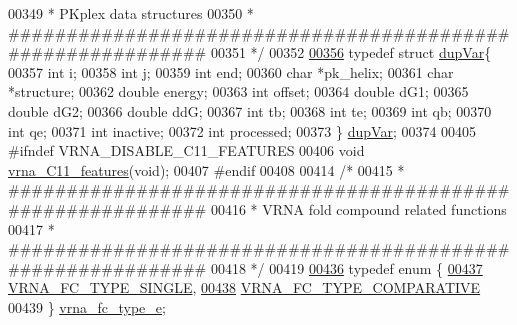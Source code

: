 \begin{DoxyCode}
00349 \textcolor{comment}{* PKplex data structures}
00350 \textcolor{comment}{* ############################################################}
00351 \textcolor{comment}{*/}
00352 
\hypertarget{data__structures_8h_source.tex_l00356}{}\hyperlink{group__data__structures}{00356} \textcolor{keyword}{typedef} \textcolor{keyword}{struct }\hyperlink{group__data__structures_structdupVar}{dupVar}\{
00357   \textcolor{keywordtype}{int} i;
00358   \textcolor{keywordtype}{int} j;
00359   \textcolor{keywordtype}{int} end;
00360   \textcolor{keywordtype}{char} *pk\_helix;
00361   \textcolor{keywordtype}{char} *structure;
00362   \textcolor{keywordtype}{double} energy;
00363   \textcolor{keywordtype}{int} offset;
00364   \textcolor{keywordtype}{double} dG1;
00365   \textcolor{keywordtype}{double} dG2;
00366   \textcolor{keywordtype}{double} ddG;
00367   \textcolor{keywordtype}{int} tb;
00368   \textcolor{keywordtype}{int} te;
00369   \textcolor{keywordtype}{int} qb;
00370   \textcolor{keywordtype}{int} qe;
00371   \textcolor{keywordtype}{int} inactive;
00372   \textcolor{keywordtype}{int} processed;
00373 \} \hyperlink{group__data__structures_gabd3b93f9aaa9f3acce2d148bae97d24e}{dupVar};
00374 
00405 \textcolor{preprocessor}{#ifndef VRNA\_DISABLE\_C11\_FEATURES}
00406 \textcolor{keywordtype}{void} \hyperlink{group__data__structures_ga21744ae2d6a17309f9327d3547cef0cb}{vrna\_C11\_features}(\textcolor{keywordtype}{void});
00407 \textcolor{preprocessor}{#endif}
00408 
00414 \textcolor{comment}{/*}
00415 \textcolor{comment}{* ############################################################}
00416 \textcolor{comment}{* VRNA fold compound related functions}
00417 \textcolor{comment}{* ############################################################}
00418 \textcolor{comment}{*/}
00419 
\hypertarget{data__structures_8h_source.tex_l00436}{}\hyperlink{group__fold__compound_ga01a4ff86fa71deaaa5d1abbd95a1447d}{00436} \textcolor{keyword}{typedef} \textcolor{keyword}{enum} \{
\hypertarget{data__structures_8h_source.tex_l00437}{}\hyperlink{group__fold__compound_gga01a4ff86fa71deaaa5d1abbd95a1447da7e264dd3cf2dc9b6448caabcb7763cd6}{00437}   \hyperlink{group__fold__compound_gga01a4ff86fa71deaaa5d1abbd95a1447da7e264dd3cf2dc9b6448caabcb7763cd6}{VRNA\_FC\_TYPE\_SINGLE},      
\hypertarget{data__structures_8h_source.tex_l00438}{}\hyperlink{group__fold__compound_gga01a4ff86fa71deaaa5d1abbd95a1447dab821ce46ea3cf665be97df22a76f5023}{00438}   \hyperlink{group__fold__compound_gga01a4ff86fa71deaaa5d1abbd95a1447dab821ce46ea3cf665be97df22a76f5023}{VRNA\_FC\_TYPE\_COMPARATIVE}  
00439 \} \hyperlink{group__fold__compound_ga01a4ff86fa71deaaa5d1abbd95a1447d}{vrna\_fc\_type\_e};

\end{DoxyCode}
